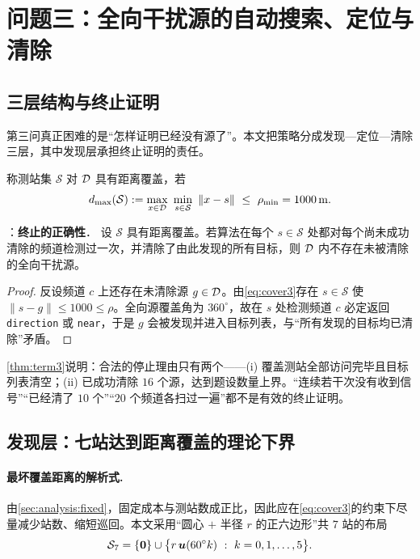 \section{问题三：全向干扰源的自动搜索、定位与清除}\label{sec:q3}

\subsection{三层结构与终止证明}

第三问真正困难的是“怎样证明已经没有源了”。本文把策略分成发现—定位—清除三层，其中发现层承担终止证明的责任。

称测站集 $\mathcal S$ 对 $\mathcal{D}$ 具有距离覆盖，若
\begin{equation}\label{eq:cover3}
  d_{\max}(\mathcal S):=\max_{x\in\Dreg}\ \min_{s\in\mathcal S}\ \|x-s\|\ \le\ \rho_{\min}=1000\mmet .
\end{equation}

\begin{theorem}：\textbf{终止的正确性}．\label{thm:term3}
设 $\mathcal S$ 具有距离覆盖。若算法在每个 $s\in\mathcal S$ 处都对每个尚未成功清除的频道检测过一次，并清除了由此发现的所有目标，则 $\mathcal{D}$ 内不存在未被清除的全向干扰源。
\end{theorem}
\begin{proof}
反设频道 $c$ 上还存在未清除源 $g\in\mathcal{D}$。由\cref{eq:cover3}存在 $s\in\mathcal S$ 使 $\|s-g\|\le1000\le\rho$。全向源覆盖角为 $360^\circ$，故在 $s$ 处检测频道 $c$ 必定返回 \texttt{direction} 或 \texttt{near}，于是 $g$ 会被发现并进入目标列表，与“所有发现的目标均已清除”矛盾。
\end{proof}

\cref{thm:term3}说明：合法的停止理由只有两个——(i) 覆盖测站全部访问完毕且目标列表清空；(ii) 已成功清除 $16$ 个源，达到题设数量上界。“连续若干次没有收到信号”“已经清了 $10$ 个”“$20$ 个频道各扫过一遍”都不是有效的终止证明。

\subsection{发现层：七站达到距离覆盖的理论下界}\label{sec:q3:layout}

\paragraph{最坏覆盖距离的解析式.}

由\cref{sec:analysis:fixed}，固定成本与测站数成正比，因此应在\cref{eq:cover3}的约束下尽量减少站数、缩短巡回。本文采用“圆心 $+$ 半径 $r$ 的正六边形”共 $7$ 站的布局
\begin{equation}\label{eq:hex}
  \mathcal S_7=\{\bm 0\}\cup\bigl\{r\,\uvec{60^\circ k}\ :\ k=0,1,\dots,5\bigr\}.
\end{equation}


